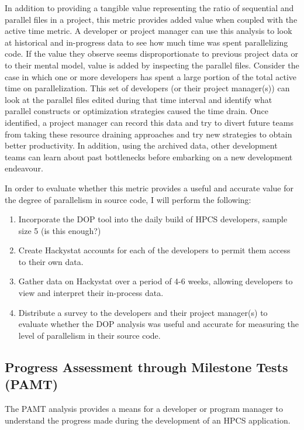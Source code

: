\documentclass[11pt,twocolumn]{article}
\begin{document}
In addition to providing a tangible value representing the ratio of
sequential and parallel files in a project, this metric provides added
value when coupled with the active time metric.  A developer or
project manager can use this analysis to look at historical and
in-progress data to see how much time was spent parallelizing code.
If the value they observe seems disproportionate to previous project
data or to their mental model, value is added by inspecting the
parallel files.  Consider the case in which one or more developers has
spent a large portion of the total active time on parallelization.
This set of developers (or their project manager(s)) can look at the
parallel files edited during that time interval and identify what
parallel constructs or optimization strategies caused the time drain.
Once identified, a project manager can record this data and try to
divert future teams from taking these resource draining approaches and
try new strategies to obtain better productivity.  In addition, using
the archived data, other development teams can learn about past
bottlenecks before embarking on a new development endeavour.

In order to evaluate whether this metric provides a useful and
accurate value for the degree of parallelism in source code, I will
perform the following: 

\begin{enumerate}
\item 
Incorporate the DOP tool into the daily build of HPCS developers,
sample size 5 (is this enough?)

\item 
Create Hackystat accounts for each of the developers to permit them
access to their own data.

\item 
Gather data on Hackystat over a period of 4-6 weeks, allowing
developers to view and interpret their in-process data.

\item 
Distribute a survey to the developers and their project manager(s) to
evaluate whether the DOP analysis was useful and accurate for
measuring the level of parallelism in their source code.
\end{enumerate}

\subsection{Progress Assessment through Milestone Tests (PAMT)}
The PAMT analysis provides a means for a developer or program manager
to understand the progress made during the development of an HPCS
application.
\end{document}
